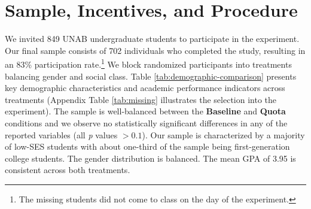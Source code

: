 \documentclass[11pt,a4paper,oneside]{article}
\begin{document}
\section{Sample, Incentives, and Procedure} \label{s4}
We invited 849 UNAB undergraduate students to participate in the experiment. Our final sample consists of 702 individuals who completed the study, resulting in an 83\% participation rate.\footnote{The missing students did not come to class on the day of the experiment.} We block randomized participants into treatments balancing gender and social class. Table \ref{tab:demographic-comparison} presents key demographic characteristics and academic performance indicators across treatments (Appendix Table \ref{tab:missing} illustrates the selection into the experiment). The sample is well-balanced between the \textbf{Baseline} and \textbf{Quota} conditions and we observe no statistically significant differences in any of the reported variables (all \textit{p} values $> 0.1$). Our sample is characterized by a majority of low-SES students with  about one-third of the sample being first-generation college students. The gender distribution is balanced. The mean GPA of 3.95 is consistent across both treatments.
\end{document}
